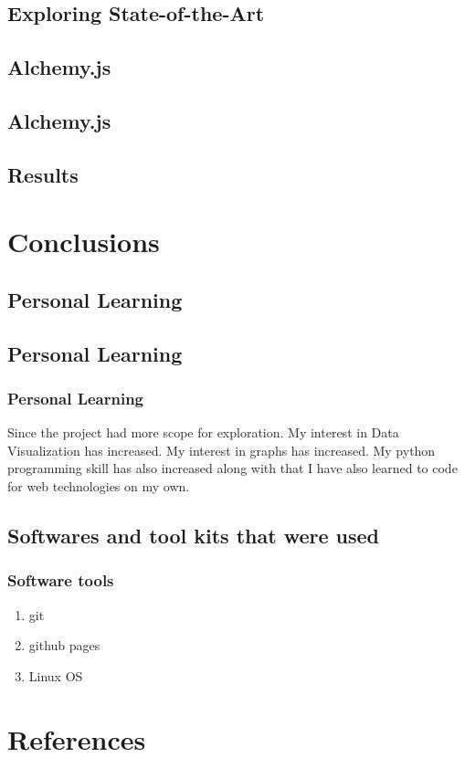 \documentclass{beamer}
\begin{document}
\subsection{Exploring State-of-the-Art} \frame{}
\subsection{Alchemy.js} \frame{}
\subsection[Experiments]{Alchemy.js} \frame{}
\subsection{Results} \frame{}




\section{Conclusions}

\subsection{Personal Learning}


\subsection{Personal Learning}

\frame
{
	\frametitle{Personal Learning}
Since the project had more scope for exploration.
My interest in Data Visualization has increased.
My interest in graphs has increased.
My python programming skill has also increased along with that I have also learned to code for web technologies on my own.
}

\subsection{Softwares and tool kits that were used}

\frame
{
	\frametitle{Software tools}
	\begin{enumerate}
		\item git
		\item github pages
		\item Linux OS
	\end{enumerate}
}



\section{References}
\end{document}
